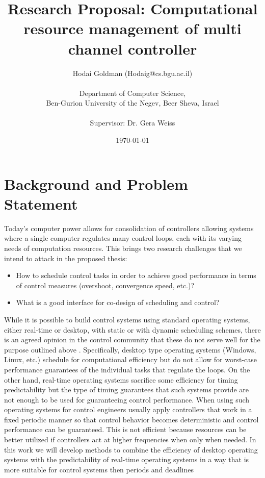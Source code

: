 \documentclass[11pt]{article}
\author{Hodai Goldman (Hodaig@cs.bgu.ac.il) \\ \\Department of Computer Science, \\Ben-Gurion University of the Negev, Beer Sheva, Israel \\ \\Supervisor: Dr. Gera Weiss}
\date{\today}
\title{Research Proposal: Computational resource management of multi channel controller}
\begin{document}
\begin{titlepage}
\maketitle
\end{titlepage}



\section{Background and Problem Statement}
\label{sec:Background}
Today's computer power allows for consolidation of controllers allowing systems where a single computer regulates many control loops, each with its varying needs of computation resources.
This brings two research challenges that we intend to attack in the proposed thesis:
\begin{itemize}
	\item How to schedule control tasks in order to achieve good performance in terms of control measures (overshoot, convergence speed, etc.)?
	\item What is a good interface for co-design of scheduling and control?
\end{itemize}

While it is possible to build control systems using standard operating systems, either real-time or desktop, with static or with dynamic scheduling schemes, there is an agreed opinion in the control community that these do not serve well for the purpose outlined above \cite{??}. Specifically, desktop type operating systems (Windows, Linux, etc.) schedule for computational efficiency but do not allow for worst-case performance guarantees of the individual tasks that regulate the loops. On the other hand, real-time operating systems sacrifice some efficiency for timing predictability but the type of timing guarantees that such systems provide are not enough to be used for guaranteeing control performance. When using such operating systems for control engineers usually apply controllers that work in a fixed periodic manner so that control behavior becomes deterministic and control performance can be guaranteed. This is not efficient because resources can be better utilized if controllers act at higher frequencies when only when needed. 
In this work we will develop methods to combine the efficiency of desktop operating systems with the predictability of real-time operating systems in a way that is more suitable for control systems then periods and deadlines
\end{document}
